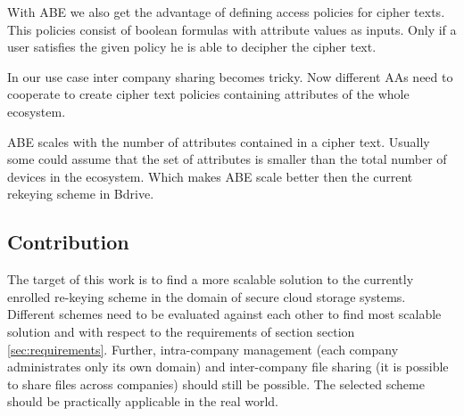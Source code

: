 With ABE we also get the advantage of defining access policies for cipher texts. This policies consist of boolean formulas with attribute values as inputs. Only if a user satisfies the given policy he is able to decipher the cipher text.

In our use case inter company sharing becomes tricky. Now different AAs need to cooperate to create cipher text policies containing attributes of the whole ecosystem.  

ABE scales with the number of attributes contained in a cipher text. Usually some could assume that the set of attributes is smaller than the total number of devices in the ecosystem. Which makes ABE scale better then the current rekeying scheme in Bdrive. 

\subsection{Contribution}
The target of this work is to find a more scalable solution to the currently enrolled re-keying scheme in the domain of secure cloud storage systems. Different schemes need to be evaluated against each other to find most scalable solution and with respect to the requirements of section section \ref{sec:requirements}. Further, intra-company management (each company administrates only its own domain) and inter-company file sharing (it is possible to share files across companies) should still be possible. The selected scheme should be practically applicable in the real world.